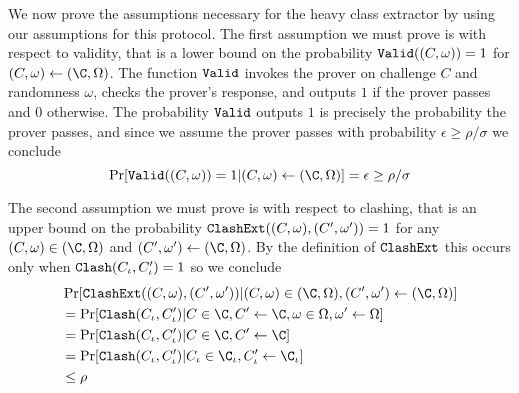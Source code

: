 We now prove the assumptions necessary for the heavy class extractor by using our assumptions for this protocol.
The first assumption we must prove is with respect to validity, that is a lower bound on the probability $\mathtt{Valid}((C,\omega))=1$ for $(C,\omega)\leftarrow(\C,\Omega)$.
The function $\mathtt{Valid}$ invokes the prover on challenge $C$ and randomness $\omega$, checks the prover's response, and outputs $1$ if the prover passes and $0$ otherwise.
The probability $\mathtt{Valid}$ outputs $1$ is precisely the probability the prover passes, and since we assume the prover passes with probability $\epsilon\geq\rho/\sigma$ we conclude
\begin{equation}
    \Pr[\Valid((C,\omega))=1|(C,\omega)\leftarrow(\C,\Omega)]
        = \epsilon \geq \rho/\sigma
\end{equation}

The second assumption we must prove is with respect to clashing, that is an upper bound on the probability $\mathtt{ClashExt}((C,\omega),(C',\omega'))=1$ for any $(C,\omega)\in(\C,\Omega)$ and $(C',\omega')\leftarrow(\C,\Omega)$.
By the definition of $\mathtt{ClashExt}$ this occurs only when $\mathtt{Clash}(C_\iota,C'_\iota)=1$ so we conclude
\begin{align}
    &\Pr[
        \ClashExt((C,\omega),(C',\omega'))
        | (C,\omega)\in(\C,\Omega), (C',\omega')\leftarrow(\C,\Omega)
    ] \\
    &= \Pr[
        \Clash(C_\iota,C'_\iota)
        | C\in\C, C'\leftarrow\C, \omega\in\Omega, \omega'\leftarrow\Omega
    ] \\
    &= \Pr[
        \Clash(C_\iota,C'_\iota)
        | C\in\C, C'\leftarrow\C
    ] \\
    &= \Pr[
        \Clash(C_\iota,C'_\iota)
        | C_\iota\in\C_\iota, C'_\iota\leftarrow\C_\iota
    ] \\
    &\leq \rho
\end{align}

